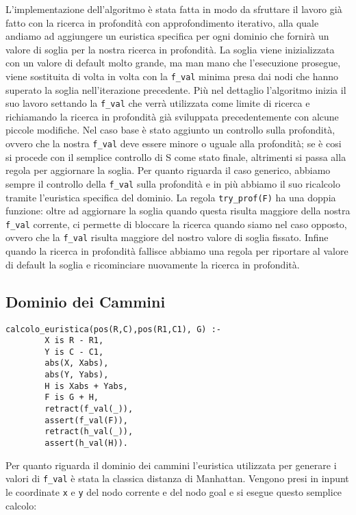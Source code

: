 L'implementazione dell'algoritmo è stata fatta in modo da sfruttare il lavoro già fatto con la ricerca in profondità con approfondimento iterativo, alla quale andiamo ad aggiungere un euristica specifica per ogni dominio che fornirà un valore di soglia per la nostra ricerca in profondità.
La soglia viene inizializzata con un valore di default molto grande, ma man mano che l'esecuzione prosegue, viene sostituita di volta in volta con la \lstinline{f_val} minima presa dai nodi che hanno superato la soglia nell'iterazione precedente.
Più nel dettaglio l'algoritmo inizia il suo lavoro settando la \lstinline{f_val} che verrà utilizzata come limite di ricerca e richiamando la ricerca in profondità già sviluppata precedentemente con alcune piccole modifiche.
Nel caso base è stato aggiunto un controllo sulla profondità, ovvero che la nostra \lstinline{f_val} deve essere minore o uguale alla profondità; se è cosi si procede con il semplice controllo di S come stato finale, altrimenti si passa alla regola per aggiornare la soglia.
Per quanto riguarda il caso generico, abbiamo sempre il controllo della \lstinline{f_val} sulla profondità e in più abbiamo il suo ricalcolo tramite l'euristica specifica del dominio. La regola \lstinline{try_prof(F)} ha una doppia funzione: oltre ad aggiornare la soglia quando questa risulta maggiore della nostra \lstinline{f_val} corrente, ci permette di bloccare la ricerca quando siamo nel caso opposto, ovvero che la \lstinline{f_val} risulta maggiore del nostro valore di soglia fissato. Infine quando la ricerca in profondità fallisce abbiamo una regola per riportare al valore di default la soglia e ricominciare nuovamente la ricerca in profondità.

\subsection{Dominio dei Cammini}

\begin{lstlisting}
calcolo_euristica(pos(R,C),pos(R1,C1), G) :-
        X is R - R1,
        Y is C - C1,
        abs(X, Xabs),
        abs(Y, Yabs),
        H is Xabs + Yabs,
        F is G + H,
        retract(f_val(_)),
        assert(f_val(F)),
        retract(h_val(_)),
        assert(h_val(H)).
\end{lstlisting}

Per quanto riguarda il dominio dei cammini l'euristica utilizzata per generare i valori di \lstinline{f_val} è stata la classica distanza di Manhattan. Vengono presi in inpunt le coordinate \lstinline{x} e \lstinline{y} del nodo corrente e del nodo goal e si esegue questo semplice calcolo:

